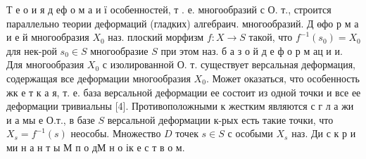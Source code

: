 \documentclass[10pt]{article}
\begin{document}
Т е о и я д еф о м а и ї особенностей, т . е. многообразий с О. т., строится параллельно теории деформаций (гладких) алгебраич. многообразий. Д өфо р м а и е й многообразия $X_{0}$ наз. плоский морфизм $f: X \rightarrow S$ такой, что $f^{-1}\left(s_{0}\right)=X_{0}$ для нек-рой $s_{0} \in S$ многообразие $S$ при этом наз. б а з о й д е ф о р м ац и и. Для многообразия $X_{0}$ с изолированной О. т. существует версальная деформация, содержащая все деформации многообразия $X_{0}$. Может оказаться, что особенность жк е т к а я, т. е. база версальной деформации ее состоит из одной точки и все ее деформации тривиальны [4]. Противоположными к жестким являются с г л а жи и а мы е О.т., в базе $S$ версальной деформации к-рых есть такие точки, что $X_{s}=f^{-1}(s)$ неособы. Множество $D$ точек $s \in S$ с особыми $X_{s}$ наз. Ди с к р и ми н а н т ы М п о дМ н о ік е с т в о м.
\end{document}

